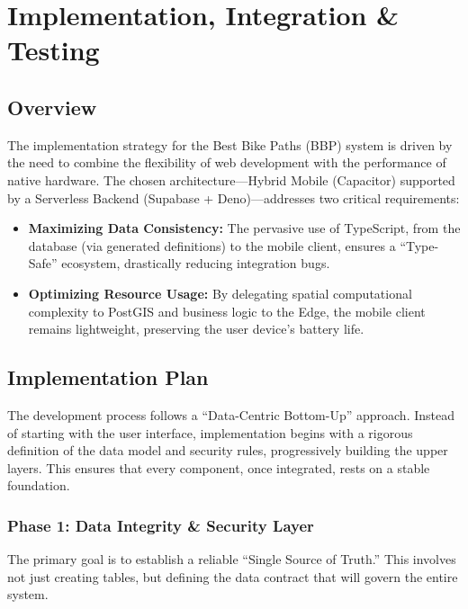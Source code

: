 \section{Implementation, Integration \& Testing}

\subsection{Overview}
The implementation strategy for the Best Bike Paths (BBP) system is driven by the need to combine the flexibility of web development with the performance of native hardware. The chosen architecture—Hybrid Mobile (Capacitor) supported by a Serverless Backend (Supabase + Deno)—addresses two critical requirements:

\begin{itemize}
    \item \textbf{Maximizing Data Consistency:} The pervasive use of TypeScript, from the database (via generated definitions) to the mobile client, ensures a ``Type-Safe'' ecosystem, drastically reducing integration bugs.
    \item \textbf{Optimizing Resource Usage:} By delegating spatial computational complexity to PostGIS and business logic to the Edge, the mobile client remains lightweight, preserving the user device's battery life.
\end{itemize}

\subsection{Implementation Plan}
The development process follows a ``Data-Centric Bottom-Up'' approach. Instead of starting with the user interface, implementation begins with a rigorous definition of the data model and security rules, progressively building the upper layers. This ensures that every component, once integrated, rests on a stable foundation.

\subsubsection{Phase 1: Data Integrity \& Security Layer}
The primary goal is to establish a reliable ``Single Source of Truth.'' This involves not just creating tables, but defining the data contract that will govern the entire system.

